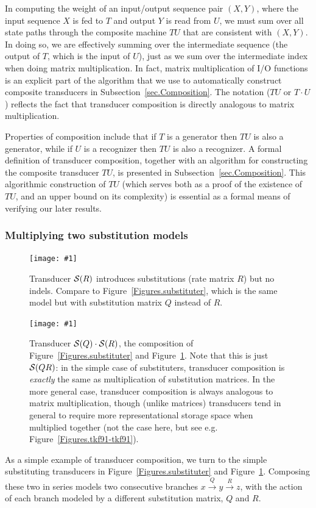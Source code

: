 \documentclass{article}
\newcommand{\secref}[1]{Subsection~\ref{sec.#1}}
\newcommand{\figref}[1]{Figure~\ref{Figures.#1}}
\newcommand{\figlabel}[1]{\label{Figures.#1}}
\newcommand{\easyfig}[4]{
\begin{figure}
\texttt{[image: \#1]}
\caption{ \figlabel{#3} #4}
\end{figure}}
\newcommand{\pdffig}[2]{\easyfig{#1-fig.pdf}{}{#1}{#2}}
\newcommand\substitute{{\cal S}}
\begin{document}
In computing the weight of an input/output sequence pair $(X,Y)$, where the input sequence $X$ is fed to $T$ and
output $Y$ is read from $U$, we must sum over all state paths through the composite machine $TU$ that are consistent with $(X,Y)$.
In doing so, we are effectively summing over the intermediate sequence
(the output of $T$, which is the input of $U$),
just as we sum over the intermediate index when doing matrix multiplication.
In fact, matrix multiplication of I/O functions is an explicit part of the algorithm that we use to automatically construct
composite transducers in \secref{Composition}.
The notation ($TU$ or $T \cdot U$) reflects the fact that transducer composition is  directly 
analogous to  matrix multiplication.  

Properties of composition include that
if $T$ is a generator then $TU$ is also a generator, while
if $U$ is a recognizer then $TU$ is also a recognizer.
A formal definition of transducer composition,
together with an algorithm for constructing the composite transducer $TU$,
is presented in \secref{Composition}. 
This algorithmic construction of $TU$
(which serves both as a proof of the existence of $TU$, and an upper bound on its complexity)
is essential as a formal means of verifying our later results.


\subsubsection{Multiplying two substitution models}

\pdffig{substituter2}{Transducer $\substitute(R)$ introduces substitutions (rate matrix $R$) but no indels. Compare to \figref{substituter}, which is the same model but with substitution matrix $Q$ instead of $R$.}

\pdffig{substituter-substituter2}{Transducer $\substitute(Q) \cdot \substitute(R)$, the composition of \figref{substituter} and \figref{substituter2}.
Note that this is just $\substitute(QR)$: in the simple case of substituters, transducer composition is {\em exactly} the same as multiplication of substitution matrices.
In the more general case, transducer composition is always analogous to matrix multiplication,
though (unlike matrices) transducers tend in general to require more representational storage space when multiplied together
(not the case here, but see e.g. \figref{tkf91-tkf91}).}

As a simple example of transducer composition, we turn to the simple substituting transducers
in \figref{substituter} and \figref{substituter2}.  
Composing these two in series models two consecutive branches 
 $x \stackrel{Q}{\to} y \stackrel{R}{\to} z$, with 
the action of each branch modeled by a different substitution matrix, $Q$ and $R$.  
\end{document}
